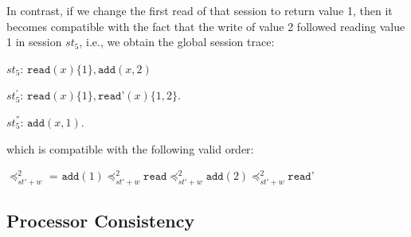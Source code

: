 \documentclass[conference]{IEEEtran}
\begin{document}
	In contrast, if we change the first read of that session to return  value 1, then it becomes compatible with the fact that the write of value 2 followed reading value 1 in session $\mathit{st}_5$, i.e., we obtain the global session trace:
	
	$\mathit{st}_5$: $\texttt{read}(x){\{1\}},\texttt{add}(x,2)$
	
	$\mathit{st}_5^{'}$: $\texttt{read}(x){\{1\}},\texttt{read'}(x){\{1,2\}}$.
	
	$\mathit{st}_5^{''}$: $\texttt{add}(x,1)$.
	
	which is compatible with the following valid order:
	
	\noindent $\preccurlyeq_{\mathit{st'}+w}^2$ = $\texttt{add}(1) \preccurlyeq_{\mathit{st'}+w}^2 \texttt{read}
	\preccurlyeq_{\mathit{st'}+w}^2  \texttt{add}(2) \preccurlyeq_{\mathit{st'}+w}^2 \texttt{read'}$
	
	\subsection{Processor Consistency}
	
\end{document}
